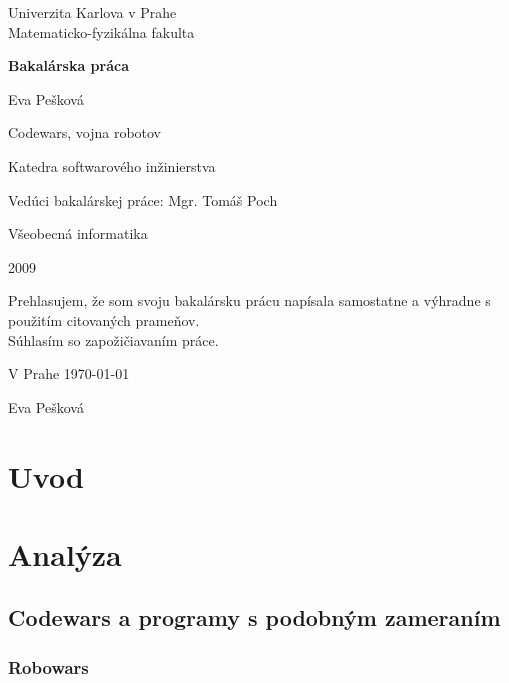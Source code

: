 \documentclass[12pt,notitlepage]{report}
\begin{document}
\begin{titlepage}
\begin{center}
\vspace{1.5in}
{\rm Univerzita Karlova v Prahe\\
    Matematicko-fyzikálna fakulta}
\par
\vspace{0.7in}
{\huge \bf Bakalárska práca}
\par
\vspace{0.5in}
{Eva Pešková}
\par
\vspace{0.5in}
Codewars, vojna robotov
\par
\vfill
Katedra softwarového inžinierstva
\par
\vspace{0.5in}
Vedúci bakalárskej práce: Mgr. Tomáš Poch
\par
\vspace{0.5in}
Všeobecná informatika
\par
\vspace{0.5in}
2009
\end{center}
\end{titlepage}
\vfill
Prehlasujem, že som svoju bakalársku prácu napísala samostatne a výhradne s použitím citovaných prameňov.\\
Súhlasím so zapožičiavaním práce.\\
\par
V Prahe \today
\begin{flushright}
Eva Pešková
\end{flushright}

\newtheorem{definicia}{Značenie}

\tableofcontents
\chapter{Uvod}%

\chapter{Analýza}
%

\section{Codewars  a programy s podobným zameraním}
\subsection {Robowars}
\end{document}
